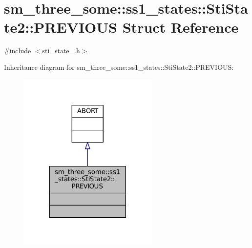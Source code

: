 \hypertarget{structsm__three__some_1_1ss1__states_1_1StiState2_1_1PREVIOUS}{}\section{sm\+\_\+three\+\_\+some\+:\+:ss1\+\_\+states\+:\+:Sti\+State2\+:\+:P\+R\+E\+V\+I\+O\+US Struct Reference}
\label{structsm__three__some_1_1ss1__states_1_1StiState2_1_1PREVIOUS}


{\ttfamily \#include $<$sti\+\_\+state\+\_.\+h$>$}



Inheritance diagram for sm\+\_\+three\+\_\+some\+:\+:ss1\+\_\+states\+:\+:Sti\+State2\+:\+:P\+R\+E\+V\+I\+O\+US\+:
\nopagebreak
\begin{figure}[H]
\begin{center}
\leavevmode
\includegraphics[width=197pt]{structsm__three__some_1_1ss1__states_1_1StiState2_1_1PREVIOUS__inherit__graph}
\end{center}
\end{figure}


